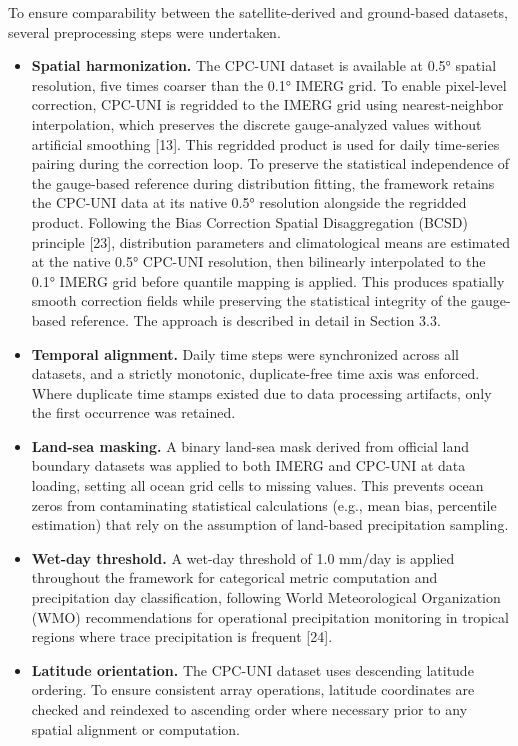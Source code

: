 \documentclass[
]{article}
\begin{document}
To ensure comparability between the satellite-derived and ground-based
datasets, several preprocessing steps were undertaken.

\begin{itemize}
\item
  \textbf{Spatial harmonization.} The CPC-UNI dataset is available at
  0.5° spatial resolution, five times coarser than the 0.1° IMERG grid.
  To enable pixel-level correction, CPC-UNI is regridded to the IMERG
  grid using nearest-neighbor interpolation, which preserves the
  discrete gauge-analyzed values without artificial smoothing {[}13{]}.
  This regridded product is used for daily time-series pairing during
  the correction loop. To preserve the statistical independence of the
  gauge-based reference during distribution fitting, the framework
  retains the CPC-UNI data at its native 0.5° resolution alongside the
  regridded product. Following the Bias Correction Spatial
  Disaggregation (BCSD) principle {[}23{]}, distribution parameters and
  climatological means are estimated at the native 0.5° CPC-UNI
  resolution, then bilinearly interpolated to the 0.1° IMERG grid before
  quantile mapping is applied. This produces spatially smooth correction
  fields while preserving the statistical integrity of the gauge-based
  reference. The approach is described in detail in Section 3.3.
\item
  \textbf{Temporal alignment.} Daily time steps were synchronized across
  all datasets, and a strictly monotonic, duplicate-free time axis was
  enforced. Where duplicate time stamps existed due to data processing
  artifacts, only the first occurrence was retained.
\item
  \textbf{Land-sea masking.} A binary land-sea mask derived from
  official land boundary datasets was applied to both IMERG and CPC-UNI
  at data loading, setting all ocean grid cells to missing values. This
  prevents ocean zeros from contaminating statistical calculations
  (e.g., mean bias, percentile estimation) that rely on the assumption
  of land-based precipitation sampling.
\item
  \textbf{Wet-day threshold.} A wet-day threshold of 1.0 mm/day is
  applied throughout the framework for categorical metric computation
  and precipitation day classification, following World Meteorological
  Organization (WMO) recommendations for operational precipitation
  monitoring in tropical regions where trace precipitation is frequent
  {[}24{]}.
\item
  \textbf{Latitude orientation.} The CPC-UNI dataset uses descending
  latitude ordering. To ensure consistent array operations, latitude
  coordinates are checked and reindexed to ascending order where
  necessary prior to any spatial alignment or computation.
\end{itemize}
\end{document}
